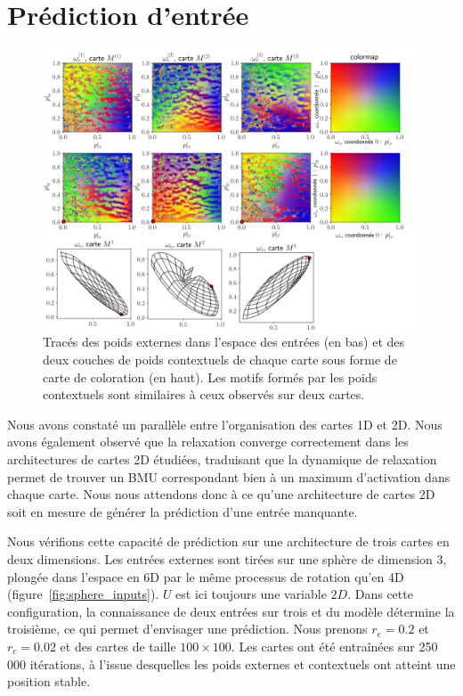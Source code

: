 \documentclass[../main]{subfiles}
\begin{document}
\section{Prédiction d'entrée \label{par:pred2D}}

\begin{figure}
	\includegraphics[width=\textwidth]{3SOM_S_wc_239999.png}
	\caption{Tracés des poids externes dans l'espace des entrées (en bas) et des deux couches de poids contextuels de chaque carte sous forme de carte de coloration (en haut). Les motifs formés par les poids contextuels sont similaires à ceux observés sur deux cartes. \label{fig:3som_w}}
\end{figure}

Nous avons constaté un parallèle entre l'organisation des cartes 1D et 2D. Nous avons également observé que la relaxation converge correctement dans les architectures de cartes 2D étudiées, traduisant que la dynamique de relaxation permet de trouver un BMU correspondant bien à un maximum d'activation dans chaque carte.
Nous nous attendons donc à ce qu'une architecture de cartes 2D soit en mesure de générer la prédiction d'une entrée manquante.

Nous vérifions cette capacité de prédiction sur une architecture de trois cartes en deux dimensions. 
Les entrées externes sont tirées sur une sphère de dimension 3, plongée dans l'espace en 6D par le même processus de rotation qu'en 4D (figure~\ref{fig:sphere_inputs}). $U$ est ici toujours une variable $2D$. 
Dans cette configuration, la connaissance de deux entrées sur trois et du modèle détermine la troisième, ce qui permet d'envisager une prédiction.
Nous prenons $r_e = 0.2$ et $r_c = 0.02$ et des cartes de taille $100 \times 100$. Les cartes ont été entraînées sur 250 000 itérations, à l'issue desquelles les poids externes et contextuels ont atteint une position stable.
\end{document}
